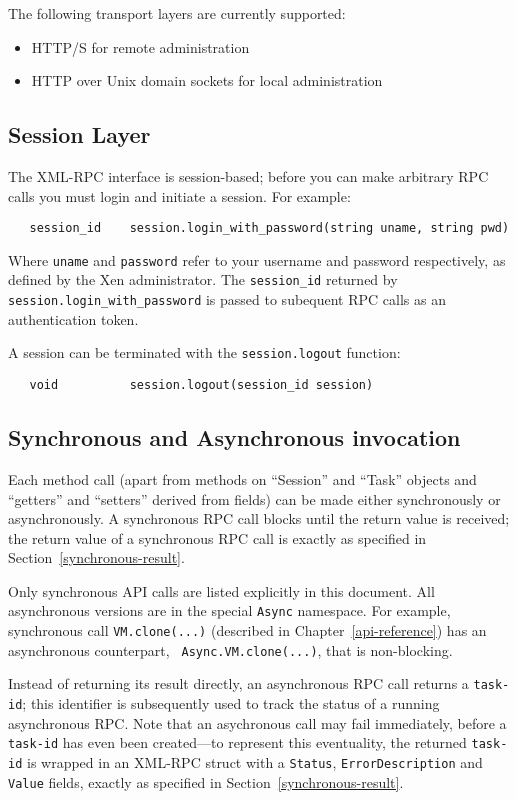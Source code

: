 The following transport layers are currently supported:
\begin{itemize}
\item HTTP/S for remote administration
\item HTTP over Unix domain sockets for local administration
\end{itemize}

\subsection{Session Layer}

The XML-RPC interface is session-based; before you can make arbitrary RPC calls
you must login and initiate a session. For example:
\begin{verbatim}
   session_id    session.login_with_password(string uname, string pwd)
\end{verbatim}
Where {\tt uname} and {\tt password} refer to your username and password
respectively, as defined by the Xen administrator.
The {\tt session\_id} returned by {\tt session.login\_with\_password} is passed
to subequent RPC calls as an authentication token.

A session can be terminated with the {\tt session.logout} function:
\begin{verbatim}
   void          session.logout(session_id session)
\end{verbatim}

\subsection{Synchronous and Asynchronous invocation}

Each method call (apart from methods on ``Session'' and ``Task'' objects 
and ``getters'' and ``setters'' derived from fields)
can be made either synchronously or asynchronously.
A synchronous RPC call blocks until the
return value is received; the return value of a synchronous RPC call is
exactly as specified in Section~\ref{synchronous-result}.

Only synchronous API calls are listed explicitly in this document. 
All asynchronous versions are in the special {\tt Async} namespace.
For example, synchronous call {\tt VM.clone(...)}
(described in Chapter~\ref{api-reference})
has an asynchronous counterpart, {\tt
Async.VM.clone(...)}, that is non-blocking.

Instead of returning its result directly, an asynchronous RPC call
returns a {\tt task-id}; this identifier is subsequently used
to track the status of a running asynchronous RPC. Note that an asychronous
call may fail immediately, before a {\tt task-id} has even been created---to
represent this eventuality, the returned {\tt task-id}
is wrapped in an XML-RPC struct with a {\tt Status}, {\tt ErrorDescription} and
{\tt Value} fields, exactly as specified in Section~\ref{synchronous-result}.

